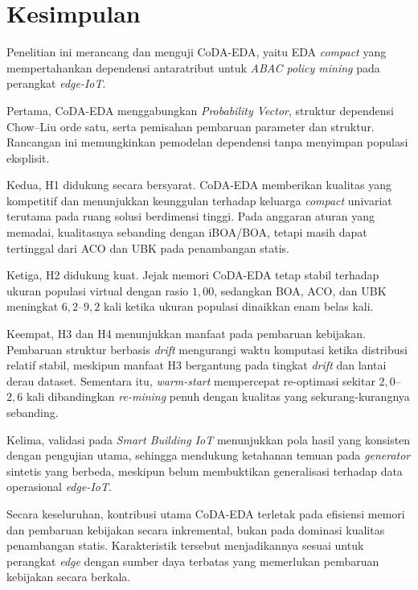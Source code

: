 \section{Kesimpulan}

Penelitian ini merancang dan menguji CoDA-EDA, yaitu EDA \textit{compact} yang mempertahankan dependensi antaratribut untuk \textit{ABAC policy mining} pada perangkat \textit{edge-IoT}.

Pertama, CoDA-EDA menggabungkan \textit{Probability Vector}, struktur dependensi Chow–Liu orde satu, serta pemisahan pembaruan parameter dan struktur. 
Rancangan ini memungkinkan pemodelan dependensi tanpa menyimpan populasi eksplisit.

Kedua, H1 didukung secara bersyarat. 
CoDA-EDA memberikan kualitas yang kompetitif dan menunjukkan keunggulan terhadap keluarga \textit{compact} univariat terutama pada ruang solusi berdimensi tinggi. 
Pada anggaran aturan yang memadai, kualitasnya sebanding dengan iBOA/BOA, tetapi masih dapat tertinggal dari ACO dan UBK pada penambangan statis.

Ketiga, H2 didukung kuat. 
Jejak memori CoDA-EDA tetap stabil terhadap ukuran populasi virtual dengan rasio $1,00$, sedangkan BOA, ACO, dan UBK meningkat $6,2$–$9,2$ kali ketika ukuran populasi dinaikkan enam belas kali.

Keempat, H3 dan H4 menunjukkan manfaat pada pembaruan kebijakan. 
Pembaruan struktur berbasis \textit{drift} mengurangi waktu komputasi ketika distribusi relatif stabil, meskipun manfaat H3 bergantung pada tingkat \textit{drift} dan lantai derau dataset. 
Sementara itu, \textit{warm-start} mempercepat re-optimasi sekitar $2,0$–$2,6$ kali dibandingkan \textit{re-mining} penuh dengan kualitas yang sekurang-kurangnya sebanding.

Kelima, validasi pada \textit{Smart Building IoT} menunjukkan pola hasil yang konsisten dengan pengujian utama, sehingga mendukung ketahanan temuan pada \textit{generator} sintetis yang berbeda, meskipun belum membuktikan generalisasi terhadap data operasional \textit{edge-IoT}.

Secara keseluruhan, kontribusi utama CoDA-EDA terletak pada efisiensi memori dan pembaruan kebijakan secara inkremental, bukan pada dominasi kualitas penambangan statis. 
Karakteristik tersebut menjadikannya sesuai untuk perangkat \textit{edge} dengan sumber daya terbatas yang memerlukan pembaruan kebijakan secara berkala.